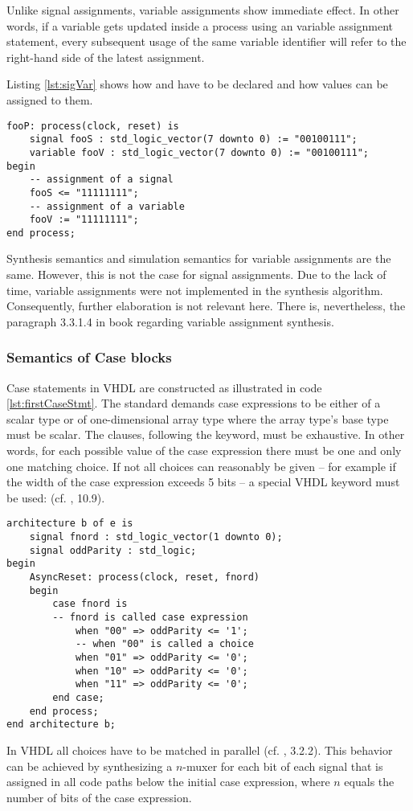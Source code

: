 Unlike signal assignments, variable assignments show immediate
effect. In other words, if a variable gets updated inside a process
using an variable assignment statement, every subsequent usage of the
same variable identifier will refer to the right-hand side of the
latest assignment.

Listing \ref{lst:sigVar} shows how  and  have to
be declared and how values can be assigned to them.
%
\begin{lstlisting}[style=vhdl,caption={Declaration of variables and
      signals},label={lst:sigVar}]
fooP: process(clock, reset) is
    signal fooS : std_logic_vector(7 downto 0) := "00100111";
    variable fooV : std_logic_vector(7 downto 0) := "00100111";
begin
    -- assignment of a signal
    fooS <= "11111111";
    -- assignment of a variable
    fooV := "11111111";
end process;
\end{lstlisting}
%
Synthesis semantics and simulation semantics for variable assignments
are the same. However, this is not the case for signal
assignments. Due to the lack of time, variable assignments were not
implemented in the synthesis algorithm. Consequently, further
elaboration is not relevant here. There is, nevertheless, the
paragraph 3.3.1.4 in
book \cite{VHDLSYNTHESE} regarding variable assignment synthesis.

\subsubsection{Semantics of Case blocks}
\label{sec:semOfCase}

Case statements in VHDL are constructed as illustrated in code
\ref{lst:firstCaseStmt}.
The standard demands case expressions to be either of a scalar type
or of one-dimensional array type where the array type's base type must
be scalar. The  clauses, following the  keyword, must
be
exhaustive. In other words, for each possible value of the case
expression there must be one and only one matching choice. If not all
choices can reasonably be given -- for example if the width of the case
expression exceeds 5 bits -- a special VHDL keyword must be used:
 (cf. \cite{IEEELRM}, 10.9).
%
\begin{lstlisting}[style=vhdl,caption={A typical IEEE 1076.6 code
      snippet},label={lst:firstCaseStmt}]
architecture b of e is
    signal fnord : std_logic_vector(1 downto 0);
    signal oddParity : std_logic;
begin
    AsyncReset: process(clock, reset, fnord)
    begin
        case fnord is
        -- fnord is called case expression
            when "00" => oddParity <= '1';
            -- when "00" is called a choice
            when "01" => oddParity <= '0';
            when "10" => oddParity <= '0';
            when "11" => oddParity <= '0';
        end case;
    end process;
end architecture b;
\end{lstlisting}
%
In VHDL all choices have to be matched in parallel
(cf. \cite{VHDLSYNTHESE}, 3.2.2). This behavior can
be achieved by synthesizing a \(n\)-muxer for each bit of each signal that
is assigned in all code paths below the initial case expression, where
\(n\) equals the number of bits of the case expression.

